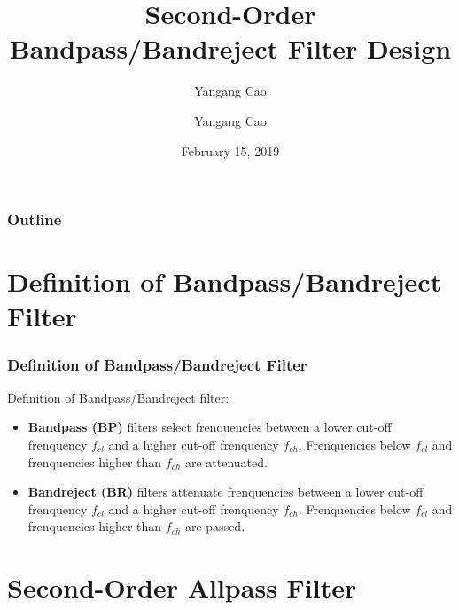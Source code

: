 \documentclass[10pt,a4paper,oneside]{beamer}
\author{Yangang Cao}
\author{Yangang Cao}
\title{Second-Order Bandpass/Bandreject Filter Design}
\date{February 15, 2019}
\begin{document}
	
	\frame[plain]{\titlepage}
	
	\begin{frame}
	\frametitle{Outline}
	\tableofcontents
\end{frame}

\section{Definition of Bandpass/Bandreject Filter}


\begin{frame}
\frametitle{Definition of Bandpass/Bandreject Filter}
\vspace{1.5cm}
 Definition of Bandpass/Bandreject filter:
\vspace{0.3cm}
\begin{itemize}
	\item {\bfseries Bandpass (BP)} filters select frenquencies between a lower cut-off frenquency $f_{cl}$ and a higher cut-off frenquency $f_{ch}$. Frenquencies below $f_{cl}$ and frenquencies higher than $f_{ch}$ are attenuated.
	\item {\bfseries Bandreject (BR)} filters attenuate frenquencies between a lower cut-off frenquency $f_{cl}$ and a higher cut-off frenquency $f_{ch}$. Frenquencies below $f_{cl}$ and frenquencies higher than $f_{ch}$ are passed.
\end{itemize}


\end{frame}

\section{Second-Order Allpass Filter}

\end{document}
